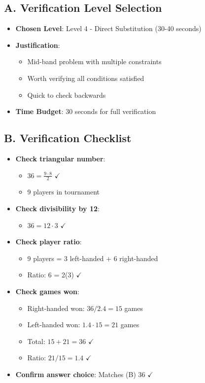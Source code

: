 \documentclass[12pt]{article}
\begin{document}
\begin{verificationbox}
\subsection*{A. Verification Level Selection}
\begin{itemize}[leftmargin=*]
    \item \textbf{Chosen Level}: Level 4 - Direct Substitution (30-40 seconds)
    \item \textbf{Justification}: 
    \begin{itemize}
        \item Mid-band problem with multiple constraints
        \item Worth verifying all conditions satisfied
        \item Quick to check backwards
    \end{itemize}
    \item \textbf{Time Budget}: 30 seconds for full verification
\end{itemize}

\subsection*{B. Verification Checklist}
\begin{itemize}[leftmargin=*]
    \item \textbf{Check triangular number}:
    \begin{itemize}
        \item $36 = \frac{9 \cdot 8}{2}$ $\checkmark$
        \item 9 players in tournament
    \end{itemize}
    \item \textbf{Check divisibility by 12}:
    \begin{itemize}
        \item $36 = 12 \cdot 3$ $\checkmark$
    \end{itemize}
    \item \textbf{Check player ratio}:
    \begin{itemize}
        \item 9 players = 3 left-handed + 6 right-handed
        \item Ratio: 6 = 2(3) $\checkmark$
    \end{itemize}
    \item \textbf{Check games won}:
    \begin{itemize}
        \item Right-handed won: $36/2.4 = 15$ games
        \item Left-handed won: $1.4 \cdot 15 = 21$ games
        \item Total: $15 + 21 = 36$ $\checkmark$
        \item Ratio: $21/15 = 1.4$ $\checkmark$
    \end{itemize}
    \item \textbf{Confirm answer choice}: Matches (B) 36 $\checkmark$
\end{itemize}


\end{verificationbox}
\end{document}
